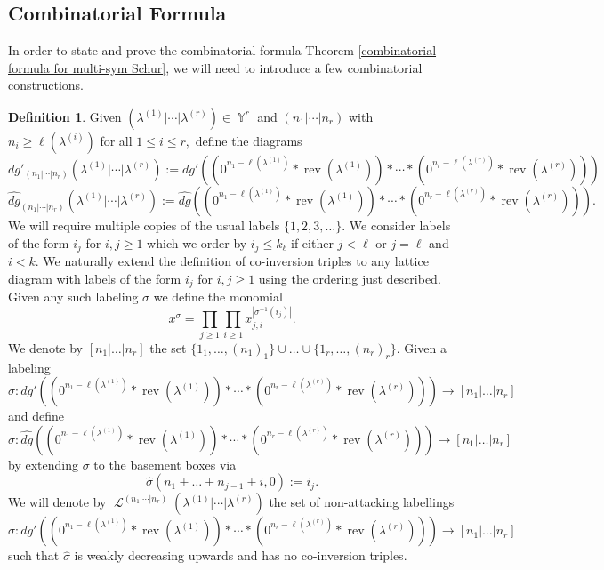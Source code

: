 \documentclass[12pt,reqno]{amsart}
\theoremstyle{definition}
\newtheorem{defn}[thm]{Definition}
\DeclareMathOperator{\Par}{\mathbb{Y}}
\DeclareMathOperator{\rev}{rev}
\DeclareMathOperator{\cL}{\mathcal{L}}
\begin{document}
\subsection{Combinatorial Formula}

In order to state and prove the combinatorial formula Theorem \ref{combinatorial formula for multi-sym Schur}, we will need to introduce a few combinatorial constructions.

\begin{defn}
    Given $(\lambda^{(1)}|\cdots |\lambda^{(r)}) \in \Par^r$ and $(n_1|\cdots|n_r)$ with $n_i \geq \ell(\lambda^{(i)})$ for all $1\leq i \leq r,$ define the diagrams 
    $$dg'_{(n_1|\cdots|n_r)}(\lambda^{(1)}|\cdots|\lambda^{(r)}):= dg'((0^{n_1-\ell(\lambda^{(1)})}*\rev(\lambda^{(1)}))*\cdots * (0^{n_r-\ell(\lambda^{(r)})}*\rev(\lambda^{(r)})))$$
    $$\widehat{dg}_{(n_1|\cdots|n_r)}(\lambda^{(1)}|\cdots|\lambda^{(r)}):= \widehat{dg}((0^{n_1-\ell(\lambda^{(1)})}*\rev(\lambda^{(1)}))*\cdots * (0^{n_r-\ell(\lambda^{(r)})}*\rev(\lambda^{(r)}))).$$
    We will require multiple copies of the usual labels $\{1,2,3,\ldots\}$. We consider labels of the form $i_j$ for $i,j \geq 1$ which we order by $i_j \leq k_{\ell}$ if either $j < \ell$ or $j = \ell$ and $i < k.$ We naturally extend the definition of co-inversion triples to any lattice diagram with labels of the form $i_j$ for $i,j \geq 1$ using the ordering just described. Given any such labeling $\sigma$ we define the monomial 
    $$x^{\sigma} = \prod_{j \geq 1} \prod_{ i \geq 1} x_{j,i}^{|\sigma^{-1}(i_j)|}.$$ We denote by $[n_1|\ldots|n_r]$ the set $\{1_1,\ldots,{(n_1)}_1\} \cup \ldots \cup \{1_r,\ldots,{(n_r)}_r \}.$ Given a labeling $$ \sigma:dg'((0^{n_1-\ell(\lambda^{(1)})}*\rev(\lambda^{(1)}))*\cdots * (0^{n_r-\ell(\lambda^{(r)})}*\rev(\lambda^{(r)}))) \rightarrow [n_1|\ldots|n_r]$$ and define 
    $$\widehat{\sigma}:\widehat{dg}((0^{n_1-\ell(\lambda^{(1)})}*\rev(\lambda^{(1)}))*\cdots * (0^{n_r-\ell(\lambda^{(r)})}*\rev(\lambda^{(r)}))) \rightarrow [n_1|\ldots|n_r]$$ by extending $\sigma$ to the basement boxes via 
    $$\widehat{\sigma}(n_1+\ldots+n_{j-1}+i,0):= i_j.$$ We will denote by $\cL^{(n_1|\cdots|n_r)}(\lambda^{(1)}|\cdots|\lambda^{(r)})$ the set of non-attacking labellings $$ \sigma:dg'((0^{n_1-\ell(\lambda^{(1)})}*\rev(\lambda^{(1)}))*\cdots * (0^{n_r-\ell(\lambda^{(r)})}*\rev(\lambda^{(r)}))) \rightarrow [n_1|\ldots|n_r]$$ such that $\widehat{\sigma}$ is weakly decreasing upwards and has no co-inversion triples. 
\end{defn}
\end{document}

